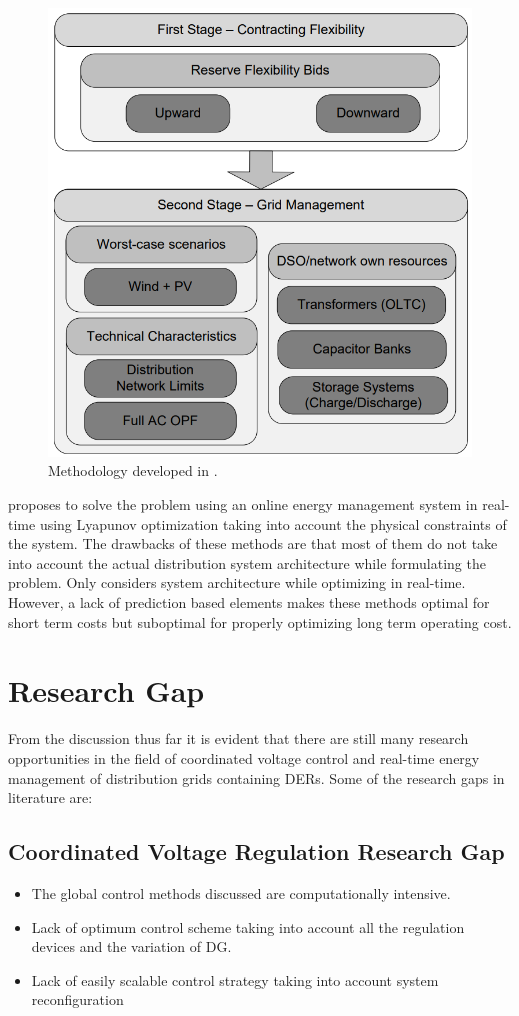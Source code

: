 \begin{figure}[!h]
\centering
\includegraphics[width=0.85\linewidth]{figs/RT_3.png}
\caption[Methodology developed]{Methodology developed in \cite{Tia17}.}
\label{fig:RT_3}
\end{figure}

\cite{Wen17} proposes to solve the problem using an online energy management system in real-time using Lyapunov optimization taking into account the physical constraints of the system.
The drawbacks of these methods are that most of them do not take into account the actual distribution system architecture while formulating the problem. Only \cite{Wen17} considers system architecture while optimizing in real-time. However, a lack of prediction based elements makes these methods optimal for short term costs but suboptimal for properly optimizing long term operating cost.





\section{Research Gap}
From the discussion thus far it is evident that there are still many research opportunities in the field of coordinated voltage control and real-time energy management of distribution grids containing DERs. Some of the research gaps in literature are:

\subsection{Coordinated Voltage Regulation Research Gap}
\begin{itemize}
    \item The global control methods discussed are computationally intensive.
    \item Lack of optimum control scheme taking into account all the regulation devices and the variation of DG.
    \item Lack of easily scalable control strategy taking into account system reconfiguration
\end{itemize}

